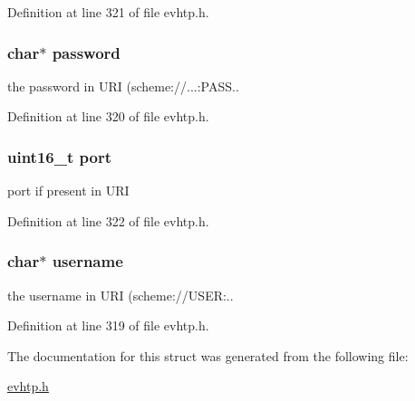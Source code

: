Definition at line 321 of file evhtp.h.

\hypertarget{structevhtp__authority__s_a59460a3ff2c12443d1022e5cc0fba85c}{
\subsubsection[{password}]{\setlength{\rightskip}{0pt plus 5cm}char$\ast$ {\bf password}}}
\label{structevhtp__authority__s_a59460a3ff2c12443d1022e5cc0fba85c}
the password in URI (scheme://...:PASS.. 

Definition at line 320 of file evhtp.h.

\hypertarget{structevhtp__authority__s_a8e0798404bf2cf5dabb84c5ba9a4f236}{
\subsubsection[{port}]{\setlength{\rightskip}{0pt plus 5cm}uint16\_\-t {\bf port}}}
\label{structevhtp__authority__s_a8e0798404bf2cf5dabb84c5ba9a4f236}
port if present in URI 

Definition at line 322 of file evhtp.h.

\hypertarget{structevhtp__authority__s_a9b20c006bd90a09e1465fb668700e81d}{
\subsubsection[{username}]{\setlength{\rightskip}{0pt plus 5cm}char$\ast$ {\bf username}}}
\label{structevhtp__authority__s_a9b20c006bd90a09e1465fb668700e81d}
the username in URI (scheme://USER:.. 

Definition at line 319 of file evhtp.h.



The documentation for this struct was generated from the following file:\begin{DoxyCompactItemize}
\item 
\hyperlink{evhtp_8h}{evhtp.h}\end{DoxyCompactItemize}
